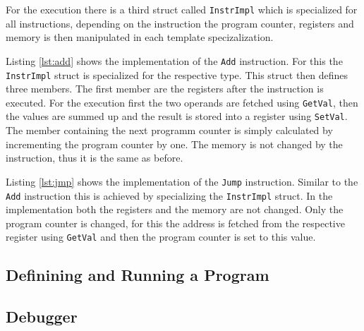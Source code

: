 For the execution there is a third struct called \lstinline{InstrImpl} which is
specialized for all instructions, depending on the instruction the program counter,
registers and memory is then manipulated in each template specizalization.

Listing \ref{lst:add} shows the implementation of the \lstinline{Add} instruction.
For this the \lstinline{InstrImpl} struct is specialized for the respective type.
This struct then defines three members. The first member are the registers after the
instruction is executed. For the execution first the two operands are fetched using
\lstinline{GetVal}, then the values are summed up and the result is stored into a
register using \lstinline{SetVal}. The member containing the next programm counter
is simply calculated by incrementing the program counter by one. The memory is not
changed by the instruction, thus it is the same as before.



Listing \ref{lst:jmp} shows the implementation of the \lstinline{Jump} instruction.
Similar to the \lstinline{Add} instruction this is achieved by specializing the 
\lstinline{InstrImpl} struct. In the implementation both the registers and the memory
are not changed. Only the program counter is changed, for this the address is fetched
from the respective register using \lstinline{GetVal} and then the program counter is
set to this value.




\subsection{Definining and Running a Program}



\subsection{Debugger}
